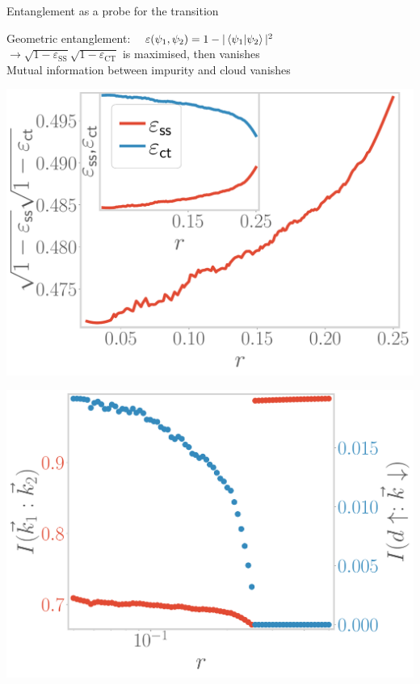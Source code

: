 \documentclass[11pt,aspectratio=169]{beamer}
\begin{document}
\begin{frame}{Entanglement as a probe for the transition}

	Geometric entanglement: ~ \(\varepsilon(\psi_1,\psi_2) = 1 - |\braket{\psi_1|\psi_2}|^2\)\\[10pt]
	\(\longrightarrow \sqrt{1 -\varepsilon_\text{SS}}\sqrt{1 -\varepsilon_\text{CT}}\) is maximised, then vanishes\\[10pt]
	Mutual information between impurity and cloud vanishes\\[10pt]

\begin{minipage}{0.49\textwidth}
	\includegraphics[width=\textwidth]{entanglement.pdf}
\end{minipage}
\hspace*{\fill}
\begin{minipage}{0.49\textwidth}
	\includegraphics[width=\textwidth]{I_k.pdf}
\end{minipage}

\end{frame}
\end{document}
